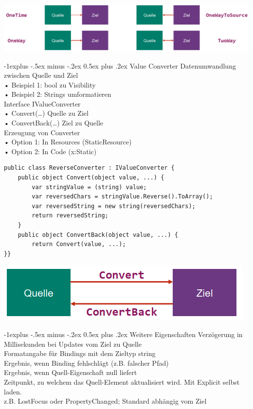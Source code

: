 \documentclass[10pt,landscape,a4paper]{article}
\makeatletter
\renewcommand{\subsection}{\@startsection{subsection}{2}{0mm}%
                                {-1explus -.5ex minus -.2ex}%
                                {0.5ex plus .2ex}%
                                {\normalfont\small\bfseries}}
\makeatother
\begin{document}
\begin{multicols*}{3}
\includegraphics[scale=0.29]{images/Bindings.PNG}

\subsection{Value Converter}
Datenumwandlung zwischen Quelle und Ziel\\
• Beispiel 1: bool zu Visibility\\
• Beispiel 2: Strings umformatieren\\
Interface IValueConverter\\
• Convert(…) Quelle zu Ziel\\
• ConvertBack(…) Ziel zu Quelle\\
Erzeugung von Converter\\
• Option 1: In Resources (StaticResource)\\
• Option 2: In Code (x:Static)

\begin{verbatim}
public class ReverseConverter : IValueConverter {
    public object Convert(object value, ...) {
        var stringValue = (string) value;
        var reversedChars = stringValue.Reverse().ToArray();
        var reversedString = new string(reversedChars);
        return reversedString;
    }
    public object ConvertBack(object value, ...) {
        return Convert(value, ...);
}}
\end{verbatim}

\includegraphics[scale=0.3]{images/Converter.PNG}

\subsection{Weitere Eigenschaften}
 Verzögerung in Millisekunden bei Updates vom Ziel zu Quelle\\
 Formatangabe für Bindings mit dem Zieltyp string\\
 Ergebnis, wenn Binding fehlschlägt (z.B. falscher Pfad)\\
 Ergebnis, wenn Quell-Eigenschaft null liefert\\
 Zeitpunkt, zu welchem das Quell-Element aktualisiert wird. Mit Explicit selbst laden.\\
z.B. LostFocus oder PropertyChanged; Standard abhängig vom Ziel


\end{multicols*}
\end{document}
